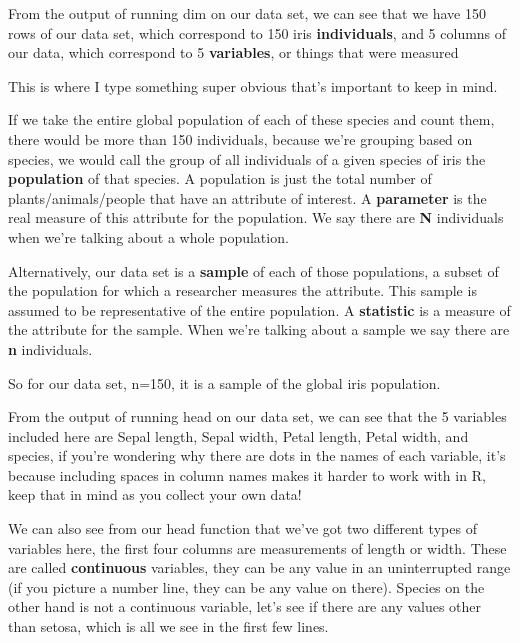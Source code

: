\documentclass[
]{article}
\newenvironment{Shaded}{\begin{snugshade}}{\end{snugshade}}
\newcommand{\CommentTok}[1]{\textcolor[rgb]{0.56,0.35,0.01}{\textit{#1}}}
\newcommand{\KeywordTok}[1]{\textcolor[rgb]{0.13,0.29,0.53}{\textbf{#1}}}
\newcommand{\NormalTok}[1]{#1}
\newcommand{\OperatorTok}[1]{\textcolor[rgb]{0.81,0.36,0.00}{\textbf{#1}}}
\begin{document}
From the output of running dim on our data set, we can see that we have
150 rows of our data set, which correspond to 150 iris
\textbf{individuals}, and 5 columns of our data, which correspond to 5
\textbf{variables}, or things that were measured

This is where I type something super obvious that's important to keep in
mind.

If we take the entire global population of each of these species and
count them, there would be more than 150 individuals, because we're
grouping based on species, we would call the group of all individuals of
a given species of iris the \textbf{population} of that species. A
population is just the total number of plants/animals/people that have
an attribute of interest. A \textbf{parameter} is the real measure of
this attribute for the population. We say there are \textbf{N}
individuals when we're talking about a whole population.

Alternatively, our data set is a \textbf{sample} of each of those
populations, a subset of the population for which a researcher measures
the attribute. This sample is assumed to be representative of the entire
population. A \textbf{statistic} is a measure of the attribute for the
sample. When we're talking about a sample we say there are \textbf{n}
individuals.

So for our data set, n=150, it is a sample of the global iris
population.

From the output of running head on our data set, we can see that the 5
variables included here are Sepal length, Sepal width, Petal length,
Petal width, and species, if you're wondering why there are dots in the
names of each variable, it's because including spaces in column names
makes it harder to work with in R, keep that in mind as you collect your
own data!

We can also see from our head function that we've got two different
types of variables here, the first four columns are measurements of
length or width. These are called \textbf{continuous} variables, they
can be any value in an uninterrupted range (if you picture a number
line, they can be any value on there). Species on the other hand is not
a continuous variable, let's see if there are any values other than
setosa, which is all we see in the first few lines.

\begin{Shaded}
\end{Shaded}
\end{document}
